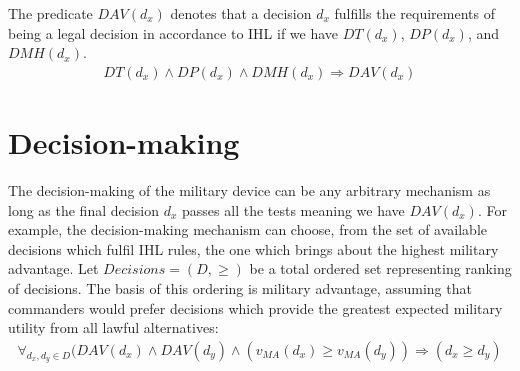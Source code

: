\begin{ddefinition}
\label{formula:dav}
The predicate $DAV(d_x)$ denotes that a decision $d_x$ fulfills the requirements of being a legal decision in accordance to IHL if we have $DT(d_x)$, $DP(d_x)$, and $DMH(d_x)$.
\begin{align*}
DT(d_x) \wedge DP(d_x) \wedge DMH(d_x) \Rightarrow DAV(d_x)
\end{align*}
\end{ddefinition}


\section{Decision-making}
The decision-making of the military device can be any arbitrary mechanism as long as the final decision $d_x$ passes all the tests meaning we have $DAV(d_x)$.  For example, the decision-making mechanism can choose, from the set of available decisions which fulfil IHL rules, the one which brings about the highest military advantage. 
Let $Decisions = (D, \geq)$ be a total ordered set representing ranking of decisions. The basis of this ordering is military advantage, assuming that commanders would prefer decisions which provide the greatest expected military utility from all lawful alternatives:
\begin{align}
\label{formula:decision}
    \forall_{d_x, d_y \in D}(DAV(d_x) \wedge DAV(d_y) \wedge (v_{MA}(d_x) \geq v_{MA}(d_y)) \Rightarrow (d_x \geq d_y)
\end{align}

